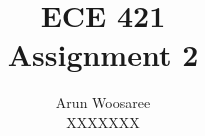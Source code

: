 \documentclass[letterpaper]{article}
\title{ECE 421 \\
Assignment 2}
\author{Arun Woosaree\\
XXXXXXX
}
\begin{document}
\maketitle %

\section{}
\inputminted[firstline=2, lastline=4]{rust}{1.rs}

\section{}
\inputminted[firstline=5, lastline=8]{rust}{2.rs}

\section{}
\inputminted[]{rust}{3.rs}

\section{}
\inputminted[]{rust}{4.rs}

\section{}
\inputminted[]{rust}{5.rs}

\section{}


\section{}


\section{}


\section{}


\section{}

\end{document}
